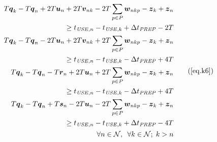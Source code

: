 \begin{equation}
    \begin{split}
        \begin{aligned}
            T \boldsymbol{q}_{k} - T \boldsymbol{q}_{n} + 2T \boldsymbol{u}_{n} 
            + 2T \boldsymbol{v}_{nk} - 2T \sum_{p \in P} \boldsymbol{w}_{nkp} 
            - \boldsymbol{z}_{k} + \boldsymbol{z}_{n}\\
            \ge t_{\mathit{USE},n} - t_{\mathit{USE},k}
            + \Delta t_{\mathit{PREP}} - 2T
        \end{aligned}\\
        \begin{aligned}
            T \boldsymbol{q}_{k} - T \boldsymbol{q}_{n} - 2T \boldsymbol{u}_{n} 
            + 2T \boldsymbol{v}_{nk} + 2T \sum_{p \in P} \boldsymbol{w}_{nkp} 
            - \boldsymbol{z}_{k} + \boldsymbol{z}_{n}\\
            \ge t_{\mathit{USE},n} - t_{\mathit{USE},k}
            - \Delta t_{\mathit{PREP}} + 4T
        \end{aligned}\\
        \begin{aligned}
            T \boldsymbol{q}_{k} - T \boldsymbol{q}_{n} - T \boldsymbol{r}_{n}
            + 2T \boldsymbol{u}_{n} + 2T \sum_{p \in P} \boldsymbol{w}_{nkp} 
            - \boldsymbol{z}_{k} + \boldsymbol{z}_{n}\\
            \ge t_{\mathit{USE},n} - t_{\mathit{USE},k}
            - \Delta t_{\mathit{PREP}} + 4T
        \end{aligned}\\
        \begin{aligned}
            T \boldsymbol{q}_{k} - T \boldsymbol{q}_{n} + T \boldsymbol{s}_{n}
            - 2T \boldsymbol{u}_{n} - 2T \sum_{p \in P} \boldsymbol{w}_{nkp} 
            - \boldsymbol{z}_{k} + \boldsymbol{z}_{n}\\
            \ge t_{\mathit{USE},n} - t_{\mathit{USE},k}
            + \Delta t_{\mathit{PREP}} - 4T
        \end{aligned}\\
        \begin{aligned}
            \forall n \in \mathcal{N}, \enspace \forall k \in \mathcal{N}; \;
            k > n
        \end{aligned}\\
    \end{split}
    \tag{\ref{eq.k6}}
\end{equation}
